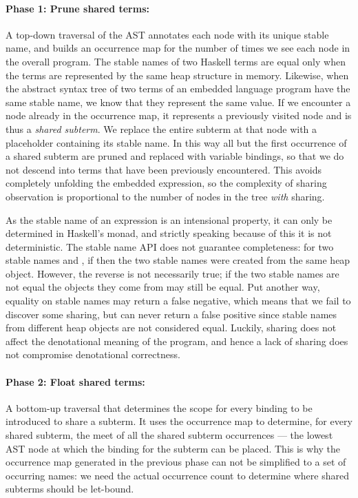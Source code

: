 \paragraph{Phase 1: Prune shared terms:}

A top-down traversal of the AST annotates each node
with its unique stable name, and builds an occurrence map for
the number of times we see each node in the overall program. The stable names of
two Haskell terms are equal only when the terms are represented by the same heap
structure in memory. Likewise, when the abstract syntax tree of two terms of an
embedded language program have the same stable name, we know that they represent
the same value. If we encounter a node already in the occurrence map, it represents a
previously visited node and is thus a \emph{shared subterm}. We replace the
entire subterm at that node with a placeholder containing its stable name. In
this way all but the first occurrence of a shared subterm are pruned and
replaced with variable bindings, so that we do not descend into terms that have
been previously encountered. This avoids completely unfolding the embedded
expression, so the complexity of sharing observation is proportional to the
number of nodes in the tree \emph{with} sharing.

As the stable name of an expression is an intensional property, it can only be
determined in Haskell's  monad, and strictly speaking because of this
it is not deterministic. The stable name API does not guarantee completeness:
for two stable names  and , if  then the
two stable names were created from the same heap object. However, the reverse is
not necessarily true; if the two stable names are not equal the objects they
come from may still be equal. Put another way, equality on stable names may
return a false negative, which means that we fail to discover some sharing, but
can never return a false positive since stable names from different heap objects
are not considered equal. Luckily, sharing does not affect the denotational
meaning of the program, and hence a lack of sharing does not compromise
denotational correctness.


\paragraph{Phase 2: Float shared terms:}

A bottom-up traversal that determines the scope for every binding to be
introduced to share a subterm. It uses the occurrence map to determine, for
every shared subterm, the meet of all the shared subterm occurrences --- the
lowest AST node at which the binding for the subterm can be placed. This is why
the occurrence map generated in the previous phase can not be simplified to
a set of occurring names: we need the actual occurrence count to determine where
shared subterms should be let-bound.



